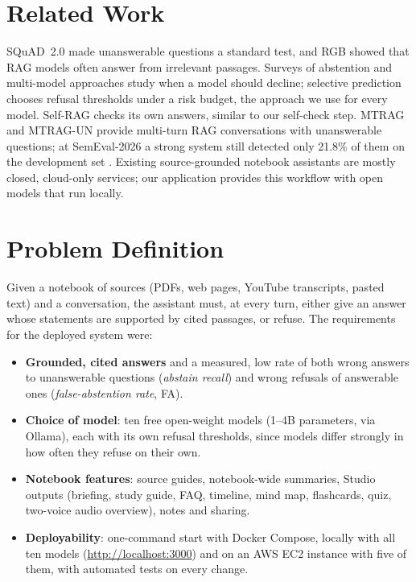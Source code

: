 \documentclass[10pt]{article}
\begin{document}
\section{Related Work}
SQuAD~2.0 \cite{squad2} made unanswerable questions a standard test, and RGB \cite{rgb} showed that RAG models often answer from irrelevant passages. Surveys of abstention \cite{wen2025} and multi-model approaches \cite{feng} study when a model should decline; selective prediction \cite{selective,kamath} chooses refusal thresholds under a risk budget, the approach we use for every model. Self-RAG \cite{selfrag} checks its own answers, similar to our self-check step. MTRAG \cite{mtrag} and MTRAG-UN \cite{mtragun} provide multi-turn RAG conversations with unanswerable questions; at SemEval-2026 a strong system still detected only 21.8\% of them on the development set \cite{ails}. Existing source-grounded notebook assistants are mostly closed, cloud-only services; our application provides this workflow with open models that run locally.

\section{Problem Definition}
Given a notebook of sources (PDFs, web pages, YouTube transcripts, pasted text) and a conversation, the assistant must, at every turn, either give an answer whose statements are supported by cited passages, or refuse. The requirements for the deployed system were:
\begin{itemize}
\item \textbf{Grounded, cited answers} and a measured, low rate of both wrong answers to unanswerable questions (\emph{abstain recall}) and wrong refusals of answerable ones (\emph{false-abstention rate}, FA).
\item \textbf{Choice of model}: ten free open-weight models (1--4B parameters, via Ollama), each with its own refusal thresholds, since models differ strongly in how often they refuse on their own.
\item \textbf{Notebook features}: source guides, notebook-wide summaries, Studio outputs (briefing, study guide, FAQ, timeline, mind map, flashcards, quiz, two-voice audio overview), notes and sharing.
\item \textbf{Deployability}: one-command start with Docker Compose, locally with all ten models (\url{http://localhost:3000}) and on an AWS EC2 instance with five of them, with automated tests on every change.
\end{itemize}
\end{document}
